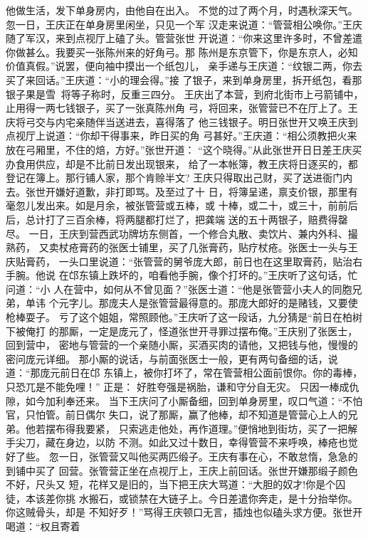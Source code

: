 他做生活，发下单身房内，由他自在出入。
不觉的过了两个月，时遇秋深天气。忽一日，王庆正在单身房里闲坐，只见一个军
汉走来说道：“管营相公唤你。”王庆随了军汉，来到点视厅上磕了头。管营张世
开说道：“你来这里许多时，不曾差遣你做甚么。我要买一张陈州来的好角弓。那
陈州是东京管下，你是东京人，必知价值真假。”说罢，便向袖中摸出一个纸包儿，
亲手递与王庆道：“纹银二两，你去买了来回话。”王庆道：“小的理会得。”接
了银子，来到单身房里，拆开纸包，看那银子果是雪，将等子称时，反重三四分。
王庆出了本营，到府北街市上弓箭铺中，止用得一两七钱银子，买了一张真陈州角
弓，将回来，张管营已不在厅上了。王庆将弓交与内宅亲随伴当送进去，喜得落了
他三钱银子。明日张世开又唤王庆到点视厅上说道：“你却干得事来，昨日买的角
弓甚好。”王庆道：“相公须教把火来放在弓厢里，不住的焙，方好。”张世开道：
“这个晓得。”从此张世开日日差王庆买办食用供应，却是不比前日发出现银来，
给了一本帐簿，教王庆将日逐买的，都登记在簿上。那行铺人家，那个肯赊半文?
王庆只得取出己财，买了送进衙门内去。张世开嫌好道歉，非打即骂。及至过了十
日，将簿呈递，禀支价银，那里有毫忽儿发出来。如是月余，被张管营或五棒，或
十棒，或二十，或三十，前前后后，总计打了三百余棒，将两腿都打烂了，把龚端
送的五十两银子，赔费得罄尽。
一日，王庆到营西武功牌坊东侧首，一个修合丸散、卖饮片、兼内外科、撮熟药，
又卖杖疮膏药的张医士铺里，买了几张膏药，贴疗杖疮。张医士一头与王庆贴膏药，
一头口里说道：“张管营的舅爷庞大郎，前日也在这里取膏药，贴治右手腕。他说
在邙东镇上跌坏的，咱看他手腕，像个打坏的。”王庆听了这句话，忙问道：“小
人在营中，如何从不曾见面？”张医士道：“他是张管营小夫人的同胞兄弟，单讳
个元字儿。那庞夫人是张管营最得意的。那庞大郎好的是赌钱，又要使枪棒耍子。
亏了这个姐姐，常照顾他。”王庆听了这一段话，九分猜是“前日在柏树下被俺打
的那厮，一定是庞元了，怪道张世开寻罪过摆布俺。”王庆别了张医士，回到营中，
密地与管营的一个亲随小厮，买酒买肉的请他，又把钱与他，慢慢的密问庞元详细。
那小厮的说话，与前面张医士一般，更有两句备细的话，说道：“那庞元前日在邙
东镇上，被你打坏了，常在管营相公面前恨你。你的毒棒，只恐兀是不能免哩！”
正是：
好胜夸强是祸胎，谦和守分自无灾。
只因一棒成仇隙，如今加利奉还来。
当下王庆问了小厮备细，回到单身房里，叹口气道：“不怕官，只怕管。前日偶尔
失口，说了那厮，赢了他棒，却不知道是管营心上人的兄弟。他若摆布得我要紧，
只索逃走他处，再作道理。”便悄地到街坊，买了一把解手尖刀，藏在身边，以防
不测。如此又过十数日，幸得管营不来呼唤，棒疮也觉好了些。
忽一日，张管营又叫他买两匹缎子。王庆有事在心，不敢怠惰，急急的到铺中买了
回营。张管营正坐在点视厅上，王庆上前回话。张世开嫌那缎子颜色不好，尺头又
短，花样又是旧的，当下把王庆大骂道：“大胆的奴才!你是个囚徒，本该差你挑
水搬石，或锁禁在大链子上。今日差遣你奔走，是十分抬举你。你这贼骨头，却是
不知好歹！”骂得王庆顿口无言，插烛也似磕头求方便。张世开喝道：“权且寄着
